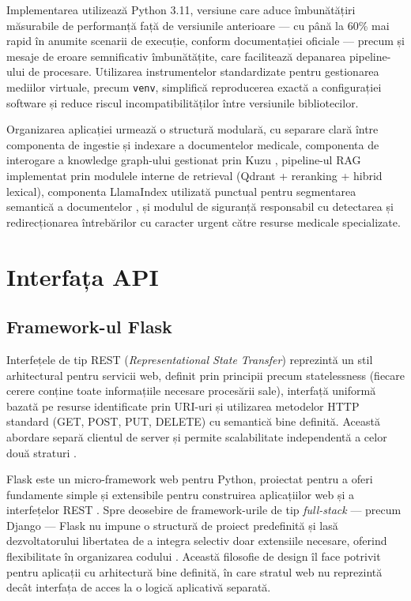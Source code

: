 \documentclass[12pt, a4paper, oneside, romanian]{teza-upb}
\begin{document}
Implementarea utilizează Python 3.11, versiune care aduce îmbunătățiri măsurabile
de performanță față de versiunile anterioare — cu până la 60\% mai rapid în anumite
scenarii de execuție, conform documentației oficiale \cite{python311} — precum și
mesaje de eroare semnificativ îmbunătățite, care facilitează depanarea pipeline-ului
de procesare. Utilizarea instrumentelor standardizate pentru gestionarea mediilor
virtuale, precum \texttt{venv}, simplifică reproducerea exactă
a configurației software și reduce riscul incompatibilităților între versiunile
bibliotecilor.

Organizarea aplicației urmează o structură modulară, cu separare clară între
componenta de ingestie și indexare a documentelor medicale, componenta de
interogare a knowledge graph-ului gestionat prin Kuzu \cite{kuzu_doc}, pipeline-ul RAG implementat
prin modulele interne de retrieval (Qdrant + reranking + hibrid lexical), componenta
LlamaIndex utilizată punctual pentru segmentarea semantică a documentelor \cite{llamaindex_doc},
și modulul de siguranță responsabil cu detectarea și redirecționarea întrebărilor
cu caracter urgent către resurse medicale specializate.


\section{Interfața API}

\subsection{Framework-ul Flask}

Interfețele de tip REST (\textit{Representational State Transfer}) reprezintă un stil arhitectural pentru servicii web, definit prin principii precum statelessness (fiecare cerere conține toate informațiile necesare procesării sale), interfață uniformă bazată pe resurse identificate prin URI-uri și utilizarea metodelor HTTP standard (GET, POST, PUT, DELETE) cu semantică bine definită. Această abordare separă clientul de server și permite scalabilitate independentă a celor două straturi \cite{fielding2000rest}.

Flask este un micro-framework web pentru Python, proiectat pentru a oferi fundamente simple și extensibile pentru construirea aplicațiilor web și a interfețelor REST \cite{flask_doc}. Spre deosebire de framework-urile de tip \textit{full-stack} — precum Django — Flask nu impune o structură de proiect predefinită și lasă dezvoltatorului libertatea de a integra selectiv doar extensiile necesare, oferind flexibilitate în organizarea codului \cite{flask_doc}. Această filosofie de design îl face potrivit pentru aplicații cu arhitectură bine definită, în care stratul web nu reprezintă decât interfața de acces la o logică aplicativă separată.
\end{document}
